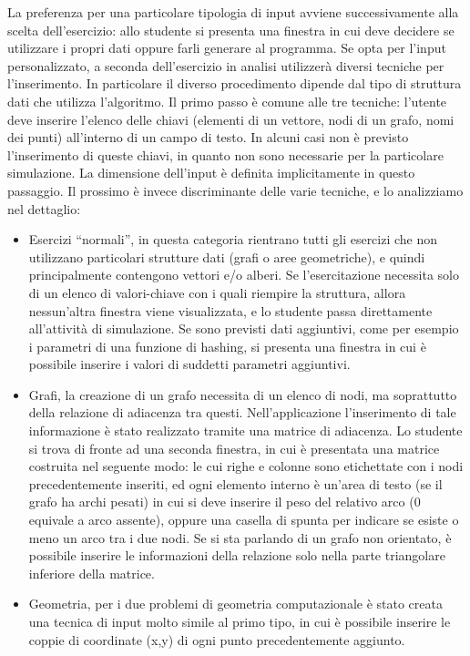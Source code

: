 La preferenza per una particolare tipologia di input avviene successivamente
alla scelta dell'esercizio: allo studente si presenta una finestra
in cui deve decidere se utilizzare i propri dati oppure farli generare
al programma. Se opta per l'input personalizzato, a seconda dell'esercizio
in analisi utilizzerà diversi tecniche per l'inserimento. In particolare
il diverso procedimento dipende dal tipo di struttura dati che utilizza
l'algoritmo. Il primo passo è comune alle tre tecniche: l'utente deve
inserire l'elenco delle chiavi (elementi di un vettore, nodi di un
grafo, nomi dei punti) all'interno di un campo di testo. In alcuni
casi non è previsto l'inserimento di queste chiavi, in quanto non
sono necessarie per la particolare simulazione. La dimensione dell'input
è definita implicitamente in questo passaggio. Il prossimo è invece
discriminante delle varie tecniche, e lo analizziamo nel dettaglio:
\begin{itemize}
\item Esercizi {}``normali'', in questa categoria rientrano tutti gli
esercizi che non utilizzano particolari strutture dati (grafi o aree
geometriche), e quindi principalmente contengono vettori e/o alberi.
Se l'esercitazione necessita solo di un elenco di valori-chiave con
i quali riempire la struttura, allora nessun'altra finestra viene
visualizzata, e lo studente passa direttamente all'attività di simulazione.
Se sono previsti dati aggiuntivi, come per esempio i parametri di
una funzione di hashing, si presenta una finestra in cui è possibile
inserire i valori di suddetti parametri aggiuntivi.
\item Grafi, la creazione di un grafo necessita di un elenco di nodi, ma
soprattutto della relazione di adiacenza tra questi. Nell'applicazione
l'inserimento di tale informazione è stato realizzato tramite una
matrice di adiacenza. Lo studente si trova di fronte ad una seconda
finestra, in cui è presentata una matrice costruita nel seguente modo:
le cui righe e colonne sono etichettate con i nodi precedentemente
inseriti, ed ogni elemento interno è un'area di testo (se il grafo
ha archi pesati) in cui si deve inserire il peso del relativo arco
(0 equivale a arco assente), oppure una casella di spunta per indicare
se esiste o meno un arco tra i due nodi. Se si sta parlando di un
grafo non orientato, è possibile inserire le informazioni della relazione
solo nella parte triangolare inferiore della matrice.
\item Geometria, per i due problemi di geometria computazionale è stato
creata una tecnica di input molto simile al primo tipo, in cui è possibile
inserire le coppie di coordinate (x,y) di ogni punto precedentemente
aggiunto.
\end{itemize}
